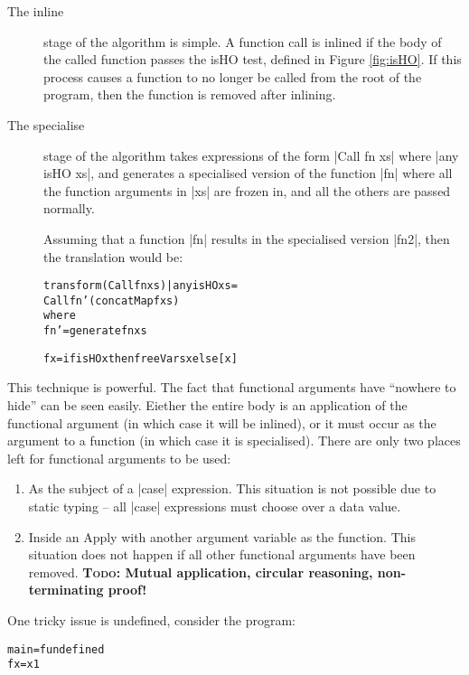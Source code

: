 \documentclass[preprint]{sigplanconf}
\newcommand{\C}[1]{\textsf{#1}}
\newcommand{\todo}[1]{\textbf{\textsc{Todo:} #1}}
\newenvironment{code}{\begin{alltt}\small}{\end{alltt}}
\begin{document}
\begin{description}
\item[The \C{inline}] stage of the algorithm is simple. A function call is inlined if the body of the called function passes the \C{isHO} test, defined in Figure \ref{fig:isHO}. If this process causes a function to no longer be called from the root of the program, then the function is removed after inlining.

\item[The \C{specialise}] stage of the algorithm takes expressions of the form |Call fn xs| where |any isHO xs|, and generates a specialised version of the function |fn| where all the function arguments in |xs| are frozen in, and all the others are passed normally.

    Assuming that a function |fn| results in the specialised version |fn2|, then the translation would be:

    \begin{code}
    transform (Call fn xs) | any isHO xs =
        Call fn' (concatMap f xs)
        where
        fn' = generate fn xs

        f x = if isHO x then freeVars x else [x]
    \end{code}
\end{description}

This technique is powerful. The fact that functional arguments have ``nowhere to hide'' can be seen easily. Eiether the entire body is an application of the functional argument (in which case it will be inlined), or it must occur as the argument to a function (in which case it is specialised). There are only two places left for functional arguments to be used:

\begin{enumerate}
\item As the subject of a |case| expression. This situation is not possible due to static typing -- all |case| expressions must choose over a data value.

\item Inside an \C{Apply} with another argument variable as the function. This situation does not happen if all other functional arguments have been removed. \todo{Mutual application, circular reasoning, non-terminating proof!}
\end{enumerate}

One tricky issue is \C{undefined}, consider the program:

\begin{code}
main = f undefined
f x = x 1
\end{code}
\end{document}
